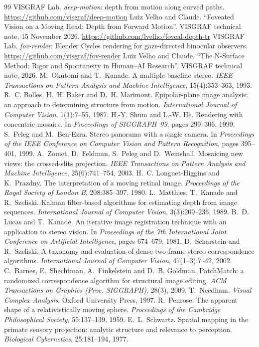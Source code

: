 \documentclass[11pt,a4paper]{article}
\begin{document}
\begin{thebibliography}{99}
 VISGRAF Lab. \emph{deep-motion}: depth from motion along curved paths.
  \url{https://github.com/visgraf/deep-motion}
 Luiz Velho and Claude. ``Foveated Vision on a Moving Head: Depth from Forward Motion''. VISGRAF technical
  note, 15 November 2026. \url{https://github.com/lvelho/foveal-depth-tr}
 VISGRAF Lab. \emph{fov-render}: Blender Cycles rendering for gaze-directed binocular observers.
  \url{https://github.com/visgraf/fov-render}
 Luiz Velho and Claude. ``The N-Surface Method: Rigor and Spontaneity in Human--AI Research''.
  VISGRAF technical note, 2026.
 M.~Okutomi and T.~Kanade. A multiple-baseline stereo. \emph{IEEE Transactions on Pattern Analysis and
  Machine Intelligence}, 15(4):353--363, 1993.
 R.~C. Bolles, H.~H. Baker and D.~H. Marimont. Epipolar-plane image analysis: an approach to determining
  structure from motion. \emph{International Journal of Computer Vision}, 1(1):7--55, 1987.
 H.-Y. Shum and L.-W. He. Rendering with concentric mosaics. In \emph{Proceedings of SIGGRAPH~99}, pages
  299--306, 1999.
 S.~Peleg and M.~Ben-Ezra. Stereo panorama with a single camera. In \emph{Proceedings of the IEEE Conference
  on Computer Vision and Pattern Recognition}, pages 395--401, 1999.
 A.~Zomet, D.~Feldman, S.~Peleg and D.~Weinshall. Mosaicing new views: the crossed-slits projection.
  \emph{IEEE Transactions on Pattern Analysis and Machine Intelligence}, 25(6):741--754, 2003.
 H.~C. Longuet-Higgins and K.~Prazdny. The interpretation of a moving retinal image.
  \emph{Proceedings of the Royal Society of London B}, 208:385--397, 1980.
 L.~Matthies, T.~Kanade and R.~Szeliski. Kalman filter-based algorithms for estimating depth from
  image sequences. \emph{International Journal of Computer Vision}, 3(3):209--236, 1989.
 B.~D. Lucas and T.~Kanade. An iterative image registration technique with an application to stereo
  vision. In \emph{Proceedings of the 7th International Joint Conference on Artificial Intelligence}, pages 674--679, 1981.
 D.~Scharstein and R.~Szeliski. A taxonomy and evaluation of dense two-frame stereo correspondence
  algorithms. \emph{International Journal of Computer Vision}, 47(1--3):7--42, 2002.
 C.~Barnes, E.~Shechtman, A.~Finkelstein and D.~B. Goldman. PatchMatch: a randomized correspondence
  algorithm for structural image editing. \emph{ACM Transactions on Graphics (Proc. SIGGRAPH)}, 28(3), 2009.
 T.~Needham. \emph{Visual Complex Analysis}. Oxford University Press, 1997.
 R.~Penrose. The apparent shape of a relativistically moving sphere. \emph{Proceedings of the Cambridge
  Philosophical Society}, 55:137--139, 1959.
 E.~L. Schwartz. Spatial mapping in the primate sensory projection: analytic structure and relevance
  to perception. \emph{Biological Cybernetics}, 25:181--194, 1977.
\end{thebibliography}
\end{document}
